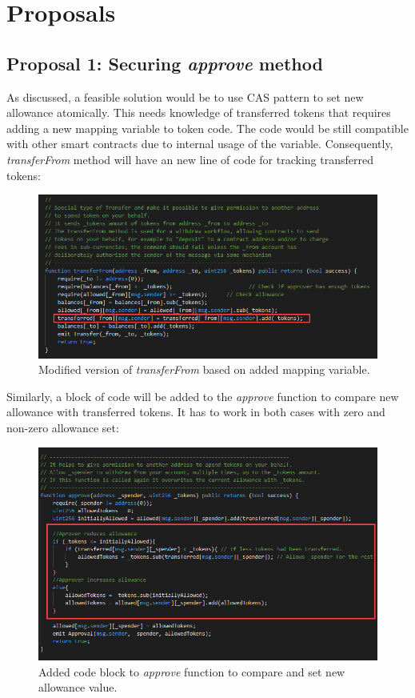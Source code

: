 
\section{Proposals}
\subsection{Proposal 1: Securing \textit{approve} method}
As discussed, a feasible solution would be to use CAS pattern to set new allowance atomically. This needs knowledge of transferred tokens that requires adding a new mapping variable to token code. The code would be still compatible with other smart contracts due to internal usage of the variable. Consequently, \textit{transferFrom} method will have an new line of code for tracking transferred tokens:
\begin{figure}[H]
	\centering
	\includegraphics[width=1.0\linewidth]{figures/multiple_withdrawal_14.png}
	\caption{Modified version of \textit{transferFrom} based on added mapping variable.}
\end{figure}
\noindent Similarly, a block of code will be added to the \textit{approve} function to compare new allowance with transferred tokens. It has to work in both cases with zero and non-zero allowance set:
\begin{figure}[H]
	\centering
	\includegraphics[width=1.0\linewidth]{figures/multiple_withdrawal_15.png}
	\caption{Added code block to \textit{approve} function to compare and set new allowance value.}
\end{figure}
